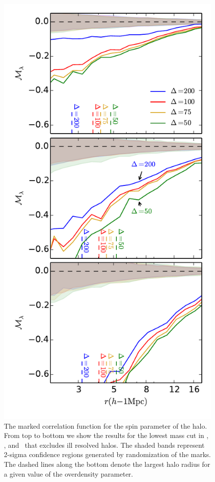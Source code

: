 \documentclass[usenatbib,usegraphicx,letterpaper]{mn2e}
\begin{document}
\begin{figure}
	\centering
	\includegraphics[width=.4\textwidth]{all_mcf_spin_z00_cutcomp.pdf}
	\caption{The marked correlation function for the spin parameter of the halo. From top to bottom we show the results for the lowest mass cut in \simA, \simB, and \simC \ that excludes ill resolved halos. The shaded bands represent 2-sigma confidence regions generated by randomization of the marks. The dashed lines along the bottom denote the largest halo radius for a given value of the overdensity parameter.
	}
	\label{fig:cc_mcf_spin}
\end{figure}
\end{document}
